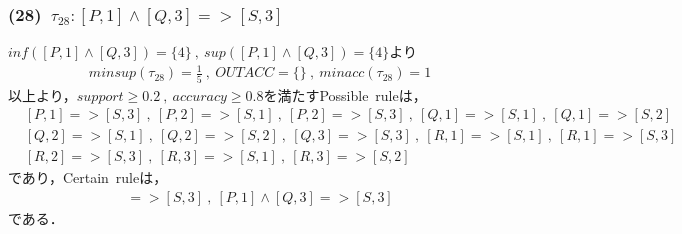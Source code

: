 \documentclass[a4paper,12pt]{jarticle}
\begin{document}
\subsubsection*{(28)~$\tau_{28}:[P,1]\land[Q,3]=>[S,3]$}
\vspace{-4mm}
$inf([P,1]\land[Q,3])=\{4\}~,~sup([P,1]\land[Q,3])=\{4\}$より
%
\begin{align*}
 minsup(\tau_{28})=\frac{1}{5}~,~OUTACC=\{\}~,~minacc(\tau_{28})=1
\end{align*}
%
以上より，$support\geq0.2~,~accuracy\geq0.8$を満たすPossible~ruleは，
%
\begin{align*}
 &[P,1]=>[S,3]~,~[P,2]=>[S,1]~,~[P,2]=>[S,3]~,~[Q,1]=>[S,1]~,~[Q,1]=>[S,2] \\
 &[Q,2]=>[S,1]~,~[Q,2]=>[S,2]~,~[Q,3]=>[S,3]~,~[R,1]=>[S,1]~,~[R,1]=>[S,3] \\
 &[R,2]=>[S,3]~,~[R,3]=>[S,1]~,~[R,3]=>[S,2]
\end{align*}
%
であり，Certain~ruleは，
%
\begin{align*}
 [R,2]=>[S,3]~,~[P,1]\land[Q,3]=>[S,3]
\end{align*}
%
である．
\end{document}
